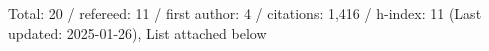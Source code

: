 Total: 20 / refereed: 11 / first author: 4 / citations: 1,416 / h-index: 11 (Last updated: 2025-01-26), List attached below